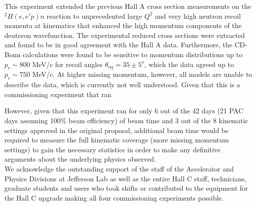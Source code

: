 \indent This experiment extended the previous Hall A cross section measurements on the $^{2}H(e,e'p)n$ reaction to 
unprecedented large $Q^{2}$ and very high neutron recoil momenta at kinematics that enhanced the high momentum components of the deuteron wavefunction.
The experimental reduced cross sections were extracted and found to be in good agreement with the Hall A data. Furthermore, the CD-Bonn calculations
were found to be sensitive to momentum distributions up to $p_{r}\sim800$ MeV/c for recoil angles $\theta_{nq}=35\pm5^{o}$, which the data agreed
up to $p_{r}\sim750$ MeV/c. At higher missing momentum, however, all models are unable to describe the data, which is currently not well understood.
Given that this is a commissioning experiment that ran 

\indent However, given that this experiment ran for only 6 out of the 42 days (21 PAC days assuming 100$\%$ beam efficiency) of beam time and 3 out of the 8 kinematic settings approved in
the original proposal\cite{e12_10_003_proposal}, additional beam time would be required to measure the full kinematic coverage (more missing momentum settings) to gain the necessary statistics 
in order to make any definitive arguments about the underlying physics observed. \\

\indent We acknowledge the outstanding support of the staff of the Accelerator and Physics Divisions at Jefferson Lab
as well as the entire Hall C staff, technicians, graduate students and users who took shifts or contributed
to the equipment for the Hall C upgrade making all four commissioning experiments possible. 

